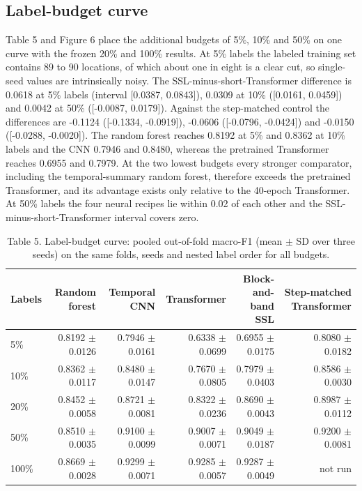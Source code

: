 \documentclass[11pt,a4paper]{article}
\begin{document}
\subsection{Label-budget curve}
Table 5 and Figure 6 place the additional budgets of 5\%, 10\% and 50\% on one curve with the frozen 20\% and 100\% results. At 5\% labels the labeled training set contains 89 to 90 locations, of which about one in eight is a clear cut, so single-seed values are intrinsically noisy. The SSL-minus-short-Transformer difference is 0.0618 at 5\% labels (interval [0.0387, 0.0843]), 0.0309 at 10\% ([0.0161, 0.0459]) and 0.0042 at 50\% ([-0.0087, 0.0179]). Against the step-matched control the differences are -0.1124 ([-0.1334, -0.0919]), -0.0606 ([-0.0796, -0.0424]) and -0.0150 ([-0.0288, -0.0020]). The random forest reaches 0.8192 at 5\% and 0.8362 at 10\% labels and the CNN 0.7946 and 0.8480, whereas the pretrained Transformer reaches 0.6955 and 0.7979. At the two lowest budgets every stronger comparator, including the temporal-summary random forest, therefore exceeds the pretrained Transformer, and its advantage exists only relative to the 40-epoch Transformer. At 50\% labels the four neural recipes lie within 0.02 of each other and the SSL-minus-short-Transformer interval covers zero.

\begin{table}[htbp]
\centering
\small
\caption{Table 5. Label-budget curve: pooled out-of-fold macro-F1 (mean $\pm$ SD over three seeds) on the same folds, seeds and nested label order for all budgets.}
\begin{tabular}{lrrrrr}
\toprule
Labels & Random forest & Temporal CNN & Transformer & Block-and-band SSL & Step-matched Transformer \\ \midrule
5\% & 0.8192 $\pm$ 0.0126 & 0.7946 $\pm$ 0.0161 & 0.6338 $\pm$ 0.0699 & 0.6955 $\pm$ 0.0175 & 0.8080 $\pm$ 0.0182 \\
10\% & 0.8362 $\pm$ 0.0117 & 0.8480 $\pm$ 0.0147 & 0.7670 $\pm$ 0.0805 & 0.7979 $\pm$ 0.0403 & 0.8586 $\pm$ 0.0030 \\
20\% & 0.8452 $\pm$ 0.0058 & 0.8721 $\pm$ 0.0081 & 0.8322 $\pm$ 0.0236 & 0.8690 $\pm$ 0.0043 & 0.8987 $\pm$ 0.0112 \\
50\% & 0.8510 $\pm$ 0.0035 & 0.9100 $\pm$ 0.0099 & 0.9007 $\pm$ 0.0071 & 0.9049 $\pm$ 0.0187 & 0.9200 $\pm$ 0.0081 \\
100\% & 0.8669 $\pm$ 0.0028 & 0.9299 $\pm$ 0.0071 & 0.9285 $\pm$ 0.0057 & 0.9287 $\pm$ 0.0049 & not run \\
\bottomrule
\end{tabular}
\end{table}
\end{document}

